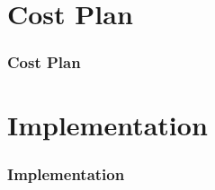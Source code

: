 \documentclass[hyperref={pdfpagelabels=false}]{beamer}
\begin{document}
\section{Cost Plan} 
\begin{frame}
	\frametitle{Cost Plan} 
\end{frame}

\section{Implementation} 
\begin{frame}
	\frametitle{Implementation} 
\end{frame}
\end{document}
